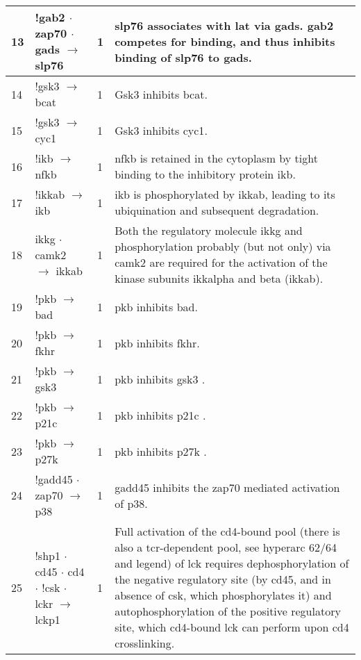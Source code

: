 \documentclass[a4paper, 12pt,epsfig, onecolumn]{article}
\newcommand{\mydot}{\hspace{-0mm} $\cdot$  \hspace{-0mm}}
\begin{document}
{\begin{center}
\begin{longtable}{|p{}|p{}|p{}|p{}|}
13& !gab2 \mydot zap70 \mydot gads $\rightarrow$ slp76        &1& slp76 associates with lat via gads\cite{HorejsiV_NatRevImm_04,TogniM_MolImm_04}. gab2 competes for binding, and thus inhibits binding of slp76 to gads\cite{yamasaki:2001,yamasaki:2003}. \\ \hline
14& !gsk3 $\rightarrow$ bcat                              &1& Gsk3 inhibits bcat\cite{Liang_CC_03}. \\ \hline
15& !gsk3 $\rightarrow$ cyc1                       &1& Gsk3 inhibits cyc1\cite{Liang_CC_03}. \\ \hline
16& !ikb $\rightarrow$ nfkb                      &1& nfkb is retained in the cytoplasm by tight binding to the inhibitory protein ikb\cite{Huang_JBC_04}. \\ \hline
17& !ikkab $\rightarrow$ ikb               &1& ikb is phosphorylated by ikkab, leading to its ubiquination and subsequent degradation\cite{Huang_JBC_04,Krauss}. \\ \hline
18& ikkg\mydot camk2 $\rightarrow$ ikkab           &1&        Both the regulatory molecule ikkg and phosphorylation probably (but not only) via camk2 are required for the activation of the kinase subunits ikkalpha and beta (ikkab)\cite{Thome_NatRevImm_2004,weil:2006,MatthewS}. \\ \hline
19& !pkb $\rightarrow$ bad              &1& pkb inhibits bad\cite{hanada:2004}. \\ \hline
20& !pkb $\rightarrow$ fkhr             &1& pkb inhibits fkhr\cite{hanada:2004}. \\ \hline
21& !pkb $\rightarrow$ gsk3        &1& pkb inhibits gsk3 \cite{Liang_CC_03,hanada:2004}. \\ \hline
22& !pkb $\rightarrow$ p21c        &1& pkb inhibits p21c \cite{Liang_CC_03,hanada:2004}. \\ \hline
23& !pkb $\rightarrow$ p27k          &1& pkb inhibits p27k \cite{Liang_CC_03,hanada:2004}. \\ \hline
24& !gadd45\mydot zap70 $\rightarrow$ p38          &1&        gadd45 inhibits the zap70 mediated activation of p38\cite{SalvadorJM_NatImmunol_05}. \\ \hline
25& !shp1\mydot cd45\mydot cd4\mydot !csk\mydot lckr $\rightarrow$ lckp1  &1& Full activation of the cd4-bound pool (there is also a tcr-dependent pool, see hyperarc 62/64 and legend) of lck requires dephosphorylation of the negative regulatory site (by cd45, and in absence of csk, which phosphorylates it) and autophosphorylation of the positive regulatory site, which cd4-bound lck can perform upon cd4 crosslinking\cite{PalaciosEH_Onco_04}. \\ \hline

\end{longtable}
\end{center}}
\end{document}
